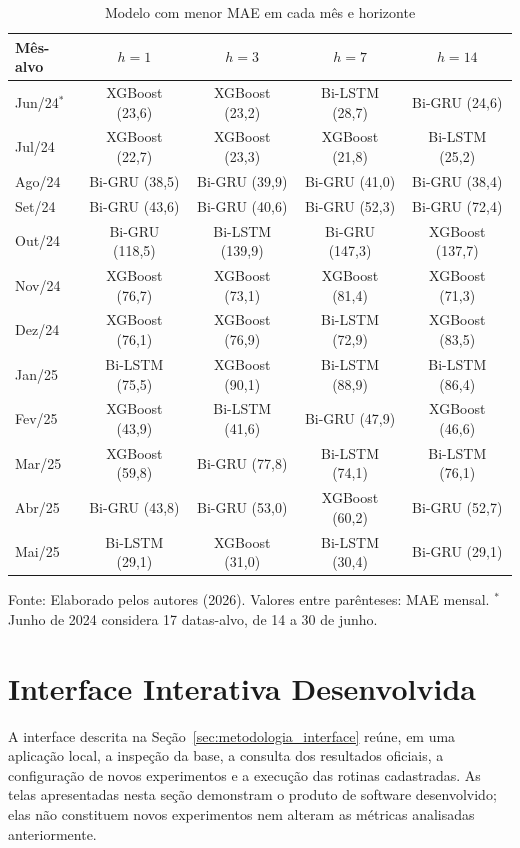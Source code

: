 \begin{table}[H]
\caption{Modelo com menor MAE em cada mês e horizonte}
\label{tab:melhor_modelo_mes_horizonte}
\begin{center}
\small
\begin{tabular}{lcccc}
\toprule
\textbf{Mês-alvo} & \textbf{$h=1$} & \textbf{$h=3$} & \textbf{$h=7$} & \textbf{$h=14$} \\
\midrule
Jun/24$^{*}$ & XGBoost (23,6) & XGBoost (23,2) & Bi-LSTM (28,7) & Bi-GRU (24,6) \\
Jul/24 & XGBoost (22,7) & XGBoost (23,3) & XGBoost (21,8) & Bi-LSTM (25,2) \\
Ago/24 & Bi-GRU (38,5) & Bi-GRU (39,9) & Bi-GRU (41,0) & Bi-GRU (38,4) \\
Set/24 & Bi-GRU (43,6) & Bi-GRU (40,6) & Bi-GRU (52,3) & Bi-GRU (72,4) \\
Out/24 & Bi-GRU (118,5) & Bi-LSTM (139,9) & Bi-GRU (147,3) & XGBoost (137,7) \\
Nov/24 & XGBoost (76,7) & XGBoost (73,1) & XGBoost (81,4) & XGBoost (71,3) \\
Dez/24 & XGBoost (76,1) & XGBoost (76,9) & Bi-LSTM (72,9) & XGBoost (83,5) \\
Jan/25 & Bi-LSTM (75,5) & XGBoost (90,1) & Bi-LSTM (88,9) & Bi-LSTM (86,4) \\
Fev/25 & XGBoost (43,9) & Bi-LSTM (41,6) & Bi-GRU (47,9) & XGBoost (46,6) \\
Mar/25 & XGBoost (59,8) & Bi-GRU (77,8) & Bi-LSTM (74,1) & Bi-LSTM (76,1) \\
Abr/25 & Bi-GRU (43,8) & Bi-GRU (53,0) & XGBoost (60,2) & Bi-GRU (52,7) \\
Mai/25 & Bi-LSTM (29,1) & XGBoost (31,0) & Bi-LSTM (30,4) & Bi-GRU (29,1) \\
\bottomrule
\end{tabular}
\normalsize
\end{center}
\small{Fonte: Elaborado pelos autores (2026). Valores entre parênteses: MAE mensal. $^{*}$Junho de 2024 considera 17 datas-alvo, de 14 a 30 de junho.}
\end{table}

\section{Interface Interativa Desenvolvida}\label{sec:resultados_interface}

A interface descrita na Seção~\ref{sec:metodologia_interface} reúne, em uma aplicação local, a inspeção da base, a consulta dos resultados oficiais, a configuração de novos experimentos e a execução das rotinas cadastradas. As telas apresentadas nesta seção demonstram o produto de software desenvolvido; elas não constituem novos experimentos nem alteram as métricas analisadas anteriormente.

